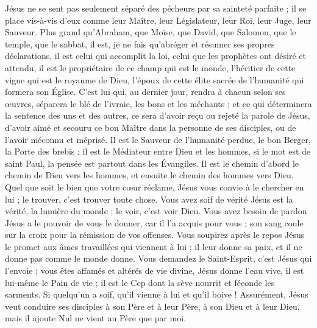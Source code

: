 Jésus ne se sent pas seulement séparé des pécheurs par sa sainteté parfaite ; il se place vis-à-vis d’eux comme leur Maître, leur Législateur, leur Roi, leur Juge, leur Sauveur.
Plus grand qu’Abraham, que Moïse, que David, que Salomon, que le temple, que le sabbat, il est, je ne fais qu’abréger et résumer ses propres déclarations, il est celui qui accomplit la loi, celui que les prophètes ont désiré et attendu, il est le propriétaire de ce champ qui est le monde, l’héritier de cette vigne qui est le royaume de Dieu, l’époux de cette élite sacrée de l’humanité qui formera son Église.
C’est lui qui, au dernier jour, rendra à chacun selon ses œuvres, séparera le blé de l’ivraie, les bons et les méchants ; et ce qui déterminera la sentence des uns et des autres, ce sera d’avoir reçu ou rejeté la parole de Jésus, d’avoir aimé et secouru ce bon Maître dans la personne de ses disciples, ou de l’avoir méconnu et méprisé.
Il est le Sauveur de l’humanité perdue, le bon Berger, la Porte des brebis ; il est le Médiateur entre Dieu et les hommes, \ocadr{} si le mot est de saint Paul, la pensée est partout dans les Évangiles.
Il est le chemin\frcolon{} d’abord le chemin de Dieu vers les hommes, et ensuite le chemin des hommes vers Dieu.
Quel que soit le bien que votre cœur réclame, Jésus vous convie à le chercher en lui ; \Og{} le trouver, c’est trouver toute chose\Fg{}. Vous avez soif de vérité\frcolon{} Jésus est la vérité, la lumière du monde ; le voir, c’est voir Dieu. Vous avez besoin de pardon\frcolon{} Jésus a le pouvoir de vous le donner, car il l’a acquis pour vous ; son sang coule sur la croix pour la rémission de vos offenses. Vous soupirez après le repos\frcolon{} Jésus le promet aux âmes travaillées qui viennent à lui ; il leur donne sa paix, et il ne donne pas comme le monde donne. Vous demandez le Saint-Esprit, c’est Jésus qui l’envoie ; vous êtes affamés et altérés de vie divine, Jésus donne l’eau vive, il est lui-même le Pain de vie ; il est le Cep dont la sève nourrit et féconde les sarments. Si quelqu’un a soif, qu’il vienne à lui et qu’il boive ! Assurément, Jésus veut conduire ses disciples à son Père et à leur Père, à son Dieu et à leur Dieu, mais il ajoute\frcolon{} \Og{} Nul ne vient au Père que par moi.\Fg{}

